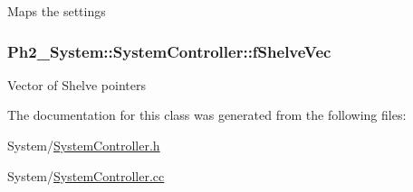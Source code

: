 Maps the settings \hypertarget{class_ph2___system_1_1_system_controller_ad98d8c88b5d4138921591ea2c971f714}{
\subsubsection[{f\-Shelve\-Vec}]{ Ph2\-\_\-\-System\-::\-System\-Controller\-::f\-Shelve\-Vec}}\label{class_ph2___system_1_1_system_controller_ad98d8c88b5d4138921591ea2c971f714}
Vector of Shelve pointers 

The documentation for this class was generated from the following files\-:\begin{DoxyCompactItemize}
\item 
System/\hyperlink{_system_controller_8h}{System\-Controller.\-h}\item 
System/\hyperlink{_system_controller_8cc}{System\-Controller.\-cc}\end{DoxyCompactItemize}
